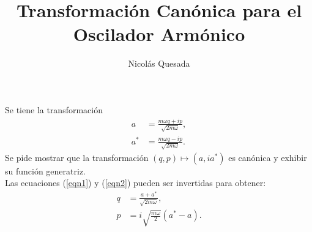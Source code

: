 \documentclass[12pt]{shreyasnotes}
\title{Transformaci\'on Can\'onica para el Oscilador Arm\'onico}
\author{Nicol\'as Quesada}
\date{}
\begin{document}
\maketitle

Se tiene la transformaci\'on 
\begin{subequations}
\begin{align}
a&=\frac{ m \omega q + i p }{
   \sqrt{ 2 m \omega }} ,
\label{eqn1}
\\
a^*&=\frac{ m \omega q - i p}{
   \sqrt{ 2m \omega }} .
\label{eqn2}
\end{align}
\end{subequations}
Se pide mostrar que la transformaci\'on $(q,p)\longmapsto(a,ia^{*})$ es can\'onica y exhibir su funci\'on generatriz.\\

Las ecuaciones (\ref{eqn1}) y (\ref{eqn2}) pueden ser invertidas para obtener:
\begin{subequations}
\begin{align}
q&=\frac{ a +a^* }{\sqrt{2 m \omega}},\\
p&=i  \sqrt{\frac{m \omega}{2}} \left(a^* -a \right).
\end{align}
\end{subequations}
\end{document}
